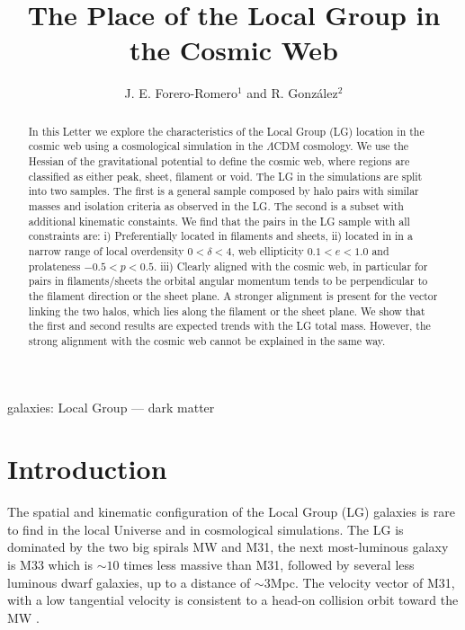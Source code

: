\documentclass{emulateapj}
\newcommand{\mpc}{\rm{Mpc}}
\begin{document}
\title{The Place of the Local Group in the Cosmic Web}
\author{J. E. Forero-Romero$^1$ and R. Gonz\'alez$^2$}


\begin{abstract}
In this Letter we explore the characteristics of the Local Group (LG)
location in the cosmic web using a cosmological simulation in the
$\Lambda$CDM cosmology.
We use the Hessian of the gravitational potential to define the cosmic web, 
where regions are classified as either peak, sheet, filament or
void. 
The LG in the simulations are split into two samples.
The first is a general sample composed by halo pairs with
similar masses and isolation criteria as observed in the LG. 
The second is a subset with additional kinematic constaints.
We find that the pairs in the LG sample with all constraints are:
i) Preferentially located in filaments and sheets,
ii) located in in a narrow range of local overdensity $0<\delta<4$, 
web ellipticity $0.1<e<1.0$ and prolateness $-0.5<p<0.5$. 
iii) Clearly aligned with the cosmic web, in particular for pairs in
filaments/sheets the orbital angular momentum tends to be
perpendicular to the filament direction or the sheet plane. A stronger
alignment is present for the vector linking the two halos, which lies
along the filament or the sheet plane.  
We show that the first and second results are expected trends with the
LG total mass. 
However, the strong alignment with the cosmic web cannot be explained
in the same way.


\end{abstract}

\begin{keywords}
{galaxies: Local Group --- dark matter}
\end{keywords}


\section{Introduction}
\label{sec:intro}

The spatial and kinematic configuration of the Local Group
(LG) galaxies is rare to find in the local Universe and in cosmological
simulations. 
The LG is dominated by the two big spirals MW and M31, the next
most-luminous galaxy is M33 which is $\sim 10$ times less massive than
M31, followed by several less luminous dwarf galaxies, up to a
distance of $\sim 3$\mpc.   
The velocity vector of M31, with a low
tangential velocity is consistent to a head-on collision orbit toward
the MW
\citep{2008MNRAS.386..461C,2012ApJ...753....8V,2012ApJ...753....7S}.   
\end{document}
